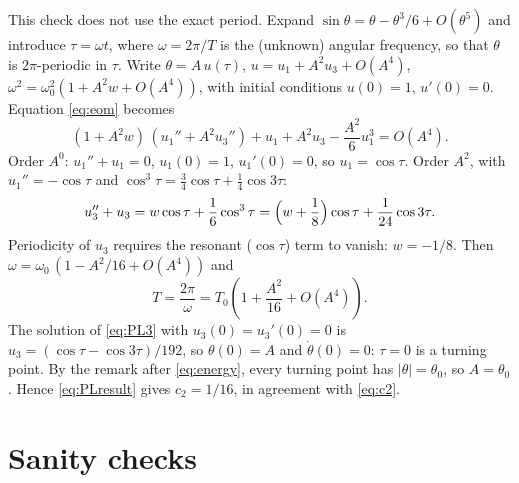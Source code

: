 \documentclass{article}
\begin{document}
This check does not use the exact period. Expand
$\sin\theta = \theta - \theta^3/6 + O(\theta^5)$ and introduce
$\tau = \omega t$, where $\omega = 2\pi/T$ is the (unknown) angular frequency,
so that $\theta$ is $2\pi$-periodic in $\tau$. Write
$\theta = A\,u(\tau)$, $u = u_1 + A^2 u_3 + O(A^4)$,
$\omega^2 = \omega_0^2(1 + A^2 w + O(A^4))$, with initial conditions
$u(0) = 1$, $u'(0) = 0$. Equation \eqref{eq:eom} becomes
\begin{equation}
  (1 + A^2 w)\,(u_1'' + A^2 u_3'') + u_1 + A^2 u_3 - \frac{A^2}{6}u_1^3
  = O(A^4).
  \label{eq:PL}
\end{equation}
Order $A^0$: $u_1'' + u_1 = 0$, $u_1(0)=1$, $u_1'(0)=0$, so
$u_1 = \cos\tau$. Order $A^2$, with $u_1'' = -\cos\tau$ and
$\cos^3\tau = \tfrac34\cos\tau + \tfrac14\cos 3\tau$:
\begin{equation}
  u_3'' + u_3 = w\cos\tau + \frac{1}{6}\cos^3\tau
  = \Bigl(w + \frac18\Bigr)\cos\tau + \frac{1}{24}\cos 3\tau .
  \label{eq:PL3}
\end{equation}
Periodicity of $u_3$ requires the resonant ($\cos\tau$) term to vanish:
$w = -1/8$. Then $\omega = \omega_0\,(1 - A^2/16 + O(A^4))$ and
\begin{equation}
  T = \frac{2\pi}{\omega} = T_0\left(1 + \frac{A^2}{16} + O(A^4)\right).
  \label{eq:PLresult}
\end{equation}
The solution of \eqref{eq:PL3} with $u_3(0) = u_3'(0) = 0$ is
$u_3 = (\cos\tau - \cos 3\tau)/192$, so $\theta(0) = A$ and
$\dot\theta(0) = 0$: $\tau = 0$ is a turning point. By the remark after
\eqref{eq:energy}, every turning point has $|\theta| = \theta_0$, so
$A = \theta_0$. Hence \eqref{eq:PLresult} gives $c_2 = 1/16$, in agreement
with \eqref{eq:c2}.

\section{Sanity checks}
\end{document}
